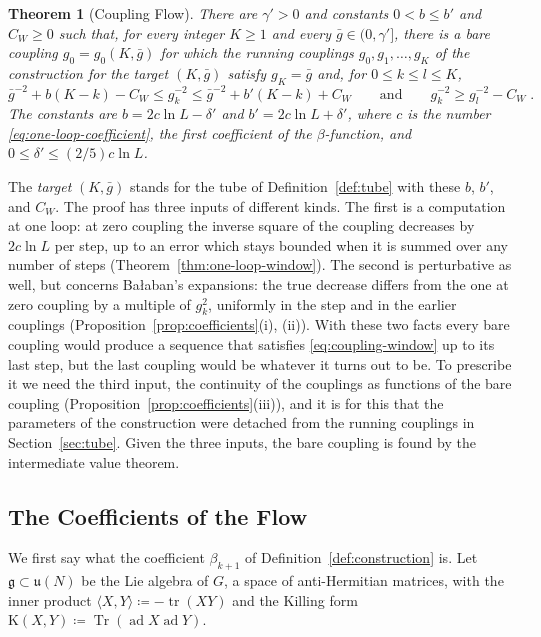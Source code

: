 \documentclass[11pt]{preprint}
\newcommand{\tr}{\operatorname{tr}}
\numberwithin{equation}{section}
\newtheorem{theorem}{Theorem}[section]
\theoremstyle{definition}
\theoremstyle{remark}
\theoremstyle{plain}
\begin{document}
\begin{theorem}[Coupling Flow]\label{thm:coupling-flow}
There are $\gamma' > 0$ and constants $0 < b \leq b'$ and $C_W \geq 0$ such that, for every integer $K \geq 1$ and every $\bar g \in (0, \gamma']$, there is a bare coupling $g_0 = g_0(K, \bar g)$ for which the running couplings $g_0, g_1, \dots, g_K$ of the construction for the target $(K, \bar g)$ satisfy $g_K = \bar g$ and, for $0 \leq k \leq l \leq K$,
\begin{equation}\label{eq:coupling-window}
    \bar g^{-2} + b(K - k) - C_W \leq g_k^{-2} \leq \bar g^{-2} + b'(K - k) + C_W
    \qquad\text{and}\qquad
    g_k^{-2} \geq g_l^{-2} - C_W\;.
\end{equation}
The constants are $b = 2c\ln L - \delta'$ and $b' = 2c\ln L + \delta'$, where $c$ is the number \eqref{eq:one-loop-coefficient}, the first coefficient of the $\beta$-function, and $0 \leq \delta' \leq (2/5)c\ln L$.
\end{theorem}

The \emph{target} $(K, \bar g)$ stands for the tube of Definition~\ref{def:tube} with these $b$, $b'$, and $C_W$. The proof has three inputs of different kinds. The first is a computation at one loop: at zero coupling the inverse square of the coupling decreases by $2c\ln L$ per step, up to an error which stays bounded when it is summed over any number of steps (Theorem~\ref{thm:one-loop-window}). The second is perturbative as well, but concerns Ba{\l}aban's expansions: the true decrease differs from the one at zero coupling by a multiple of $g_k^2$, uniformly in the step and in the earlier couplings (Proposition~\ref{prop:coefficients}(i), (ii)). With these two facts every bare coupling would produce a sequence that satisfies \eqref{eq:coupling-window} up to its last step, but the last coupling would be whatever it turns out to be. To prescribe it we need the third input, the continuity of the couplings as functions of the bare coupling (Proposition~\ref{prop:coefficients}(iii)), and it is for this that the parameters of the construction were detached from the running couplings in Section~\ref{sec:tube}. Given the three inputs, the bare coupling is found by the intermediate value theorem.

\subsection{The Coefficients of the Flow}\label{sec:flow-coefficients}

We first say what the coefficient $\beta_{k+1}$ of Definition~\ref{def:construction} is. Let $\mathfrak g \subset \mathfrak u(N)$ be the Lie algebra of $G$, a space of anti-Hermitian matrices, with the inner product $\langle X, Y \rangle \coloneqq -\tr(XY)$ and the Killing form $\mathrm K(X, Y) \coloneqq \operatorname{Tr}(\operatorname{ad}X\operatorname{ad}Y)$.
\end{document}
